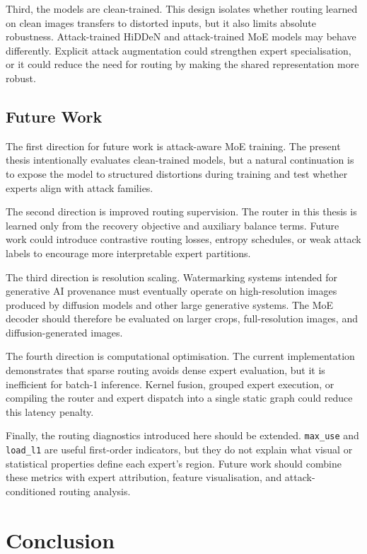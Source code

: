 ﻿\documentclass[12pt, a4paper, twoside]{report}
\numberwithin{equation}{chapter}
\begin{document}
Third, the models are clean-trained. This design isolates whether routing learned on clean images transfers to distorted inputs, but it also limits absolute robustness. Attack-trained HiDDeN and attack-trained MoE models may behave differently. Explicit attack augmentation could strengthen expert specialisation, or it could reduce the need for routing by making the shared representation more robust.

\section{Future Work}

The first direction for future work is attack-aware MoE training. The present thesis intentionally evaluates clean-trained models, but a natural continuation is to expose the model to structured distortions during training and test whether experts align with attack families.

The second direction is improved routing supervision. The router in this thesis is learned only from the recovery objective and auxiliary balance terms. Future work could introduce contrastive routing losses, entropy schedules, or weak attack labels to encourage more interpretable expert partitions.

The third direction is resolution scaling. Watermarking systems intended for generative AI provenance must eventually operate on high-resolution images produced by diffusion models and other large generative systems. The MoE decoder should therefore be evaluated on larger crops, full-resolution images, and diffusion-generated images.

The fourth direction is computational optimisation. The current implementation demonstrates that sparse routing avoids dense expert evaluation, but it is inefficient for batch-1 inference. Kernel fusion, grouped expert execution, or compiling the router and expert dispatch into a single static graph could reduce this latency penalty.

Finally, the routing diagnostics introduced here should be extended. \texttt{max\_use} and \texttt{load\_l1} are useful first-order indicators, but they do not explain what visual or statistical properties define each expert's region. Future work should combine these metrics with expert attribution, feature visualisation, and attack-conditioned routing analysis.

\chapter{Conclusion}
\label{ch:conclusion}
\end{document}
